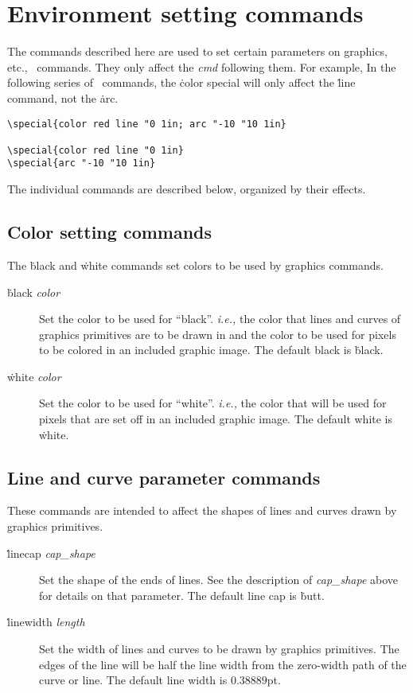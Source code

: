 \section{Environment setting commands}\label{sec:env}
The commands described here are used to set certain parameters on
graphics, etc., %
    \Special\ commands. They only affect %
    the {\it cmd\/}
following them. For example, In the following series of \Special\
commands, the \.{color} special will only affect the \.{line} command,
not the
\.{arc}.
\begin{verbatim}
\special{color red line "0 1in; arc "-10 "10 1in}

\special{color red line "0 1in}
\special{arc "-10 "10 1in}
\end{verbatim}

The %
    individual commands are described below, organized by their
effects. %

\subsection{Color setting commands}
The \.{black} and \.{white} commands set colors to be used by graphics
commands.
\begin{description}
\item[\.{black} {\it color\/}] Set the color to be used for ``black''.
         {\it i.e.,\/} the color that lines and curves of graphics
         primitives are to be drawn in and the color to be used for
         pixels to be colored in an included graphic image. The default
         black is \.{black}.
\item[\.{white} {\it color\/}] Set the color to be used for ``white''.
         {\it i.e.,\/} the color that will be used for pixels that
         are set off in an included graphic image. The default white is
         \.{white}.
\end{description}

\subsection{Line and curve parameter commands}
These commands are intended to affect the shapes of lines and curves
drawn by graphics primitives.
\begin{description}
\item[\.{linecap} {\it cap\_shape}] Set the shape of the ends of lines.
         See the description of {\it cap\_shape\/} above for details
         on that parameter. The default line cap is \.{butt}.
\item[\.{linewidth} {\it length}] Set the width of lines and curves to be
         drawn by graphics primitives. The edges of the line will be
         half the line width from the zero-width path of the curve or
         line. The default line width is $0.38889$pt.
\end{description}

